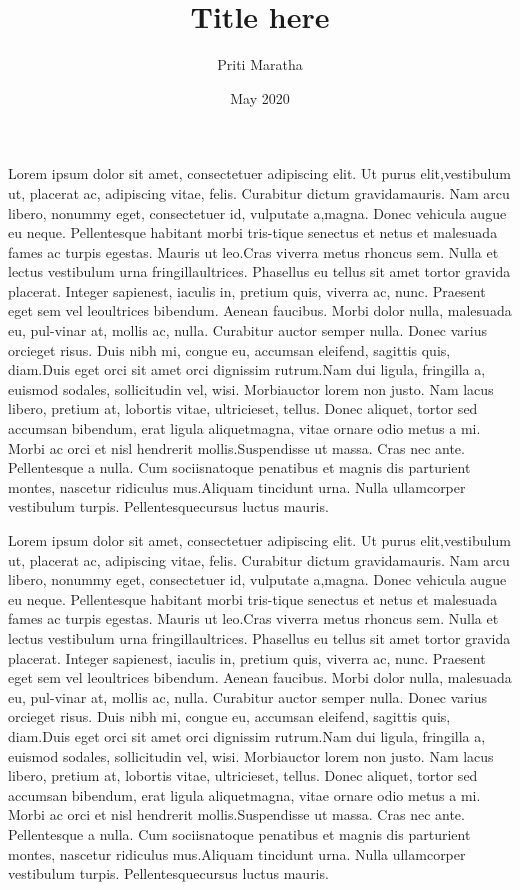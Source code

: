 \documentclass[11pt,a4paper]{article}
\begin{document}
\title{Title here} 
\date{May 2020}
\author{Priti Maratha}
\maketitle
\thispagestyle{fancy}
Lorem ipsum dolor sit amet, consectetuer adipiscing elit. Ut purus elit,vestibulum ut, placerat ac, adipiscing vitae, felis. Curabitur dictum gravidamauris.  Nam arcu libero, nonummy eget, consectetuer id, vulputate a,magna. Donec vehicula augue eu neque. Pellentesque habitant morbi tris-tique senectus et netus et malesuada fames ac turpis egestas. Mauris ut leo.Cras viverra metus rhoncus sem. Nulla et lectus vestibulum urna fringillaultrices. Phasellus eu tellus sit amet tortor gravida placerat. Integer sapienest, iaculis in, pretium quis, viverra ac, nunc.  Praesent eget sem vel leoultrices bibendum. Aenean faucibus. Morbi dolor nulla, malesuada eu, pul-vinar at, mollis ac, nulla. Curabitur auctor semper nulla. Donec varius orcieget risus. Duis nibh mi, congue eu, accumsan eleifend, sagittis quis, diam.Duis eget orci sit amet orci dignissim rutrum.Nam dui ligula, fringilla a, euismod sodales, sollicitudin vel, wisi. Morbiauctor lorem non justo. Nam lacus libero, pretium at, lobortis vitae, ultricieset, tellus. Donec aliquet, tortor sed accumsan bibendum, erat ligula aliquetmagna, vitae ornare odio metus a mi. Morbi ac orci et nisl hendrerit mollis.Suspendisse ut massa.  Cras nec ante.  Pellentesque a nulla.  Cum sociisnatoque penatibus et magnis dis parturient montes, nascetur ridiculus mus.Aliquam tincidunt urna. Nulla ullamcorper vestibulum turpis. Pellentesquecursus luctus mauris.
\par
Lorem ipsum dolor sit amet, consectetuer adipiscing elit. Ut purus elit,vestibulum ut, placerat ac, adipiscing vitae, felis. Curabitur dictum gravidamauris.  Nam arcu libero, nonummy eget, consectetuer id, vulputate a,magna. Donec vehicula augue eu neque. Pellentesque habitant morbi tris-tique senectus et netus et malesuada fames ac turpis egestas. Mauris ut leo.Cras viverra metus rhoncus sem. Nulla et lectus vestibulum urna fringillaultrices. Phasellus eu tellus sit amet tortor gravida placerat. Integer sapienest, iaculis in, pretium quis, viverra ac, nunc.  Praesent eget sem vel leoultrices bibendum. Aenean faucibus. Morbi dolor nulla, malesuada eu, pul-vinar at, mollis ac, nulla. Curabitur auctor semper nulla. Donec varius orcieget risus. Duis nibh mi, congue eu, accumsan eleifend, sagittis quis, diam.Duis eget orci sit amet orci dignissim rutrum.Nam dui ligula, fringilla a, euismod sodales, sollicitudin vel, wisi. Morbiauctor lorem non justo. Nam lacus libero, pretium at, lobortis vitae, ultricieset, tellus. Donec aliquet, tortor sed accumsan bibendum, erat ligula aliquetmagna, vitae ornare odio metus a mi. Morbi ac orci et nisl hendrerit mollis.Suspendisse ut massa.  Cras nec ante.  Pellentesque a nulla.  Cum sociisnatoque penatibus et magnis dis parturient montes, nascetur ridiculus mus.Aliquam tincidunt urna. Nulla ullamcorper vestibulum turpis. Pellentesquecursus luctus mauris.
\par
\end{document}
